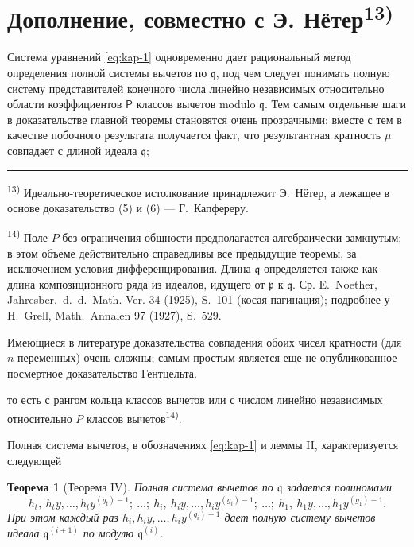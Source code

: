 \documentclass[11pt]{article}
\newcommand{\foreign}[1]{#1}
\theoremstyle{plain}
\newtheorem{satz}{Теорема}
\begin{document}
\newpage
\section*{Дополнение, совместно с Э. Нётер\textsuperscript{13)}}

Система уравнений \eqref{eq:kap-1} одновременно дает рациональный
метод определения полной системы вычетов по $\mathfrak{q}$, под чем
следует понимать полную систему представителей конечного числа
линейно независимых относительно области коэффициентов $\mathsf{P}$ классов
вычетов modulo $\mathfrak{q}$. Тем самым отдельные шаги в
доказательстве главной теоремы становятся очень прозрачными; вместе
с тем в качестве побочного результата получается факт, что
результантная кратность $\mu$ совпадает с длиной идеала
$\mathfrak{q}$;

\vspace{0.5em}
\noindent\rule{\textwidth}{0.4pt}
\vspace{0.3em}

{\footnotesize
\textsuperscript{13)} Идеально-теоретическое истолкование принадлежит
Э.\ Нётер, а лежащее в основе доказательство (5) и (6) --- Г.\ Капфереру.

\textsuperscript{14)} Поле $P$ без ограничения общности предполагается
алгебраически замкнутым; в этом объеме действительно справедливы все
предыдущие теоремы, за исключением условия дифференцирования. Длина
$\mathfrak{q}$ определяется также как длина композиционного ряда из
идеалов, идущего от $\mathfrak{p}$ к $\mathfrak{q}$. Ср. E.\ Noether,
\foreign{Jahresber.\ d.\ d.\ Math.-Ver.} 34 (1925), S.~101
(косая пагинация); подробнее у H.\ Grell, \foreign{Math.\ Annalen} 97
(1927), S.~529.

Имеющиеся в литературе доказательства совпадения обоих чисел
кратности (для $n$ переменных) очень сложны; самым простым является
еще не опубликованное посмертное доказательство Гентцельта.
}

\vspace{1em}
то есть с рангом кольца классов вычетов или с числом линейно
независимых относительно $P$ классов вычетов\textsuperscript{14)}.

Полная система вычетов, в обозначениях \eqref{eq:kap-1} и леммы II,
характеризуется следующей

\begin{satz}[Теорема IV]\label{satz:kap-IV}
Полная система вычетов по $\mathfrak{q}$ задается полиномами
\[
h_{t},\ h_{t}y,\ldots,h_{t}y^{(g_{t})-1};\ \ldots;\
h_{i},\ h_{i}y,\ldots,h_{i}y^{(g_{i})-1};\ \ldots;\
h_{1},\ h_{1}y,\ldots,h_{1}y^{(g_{1})-1}.
\]
При этом каждый раз $h_{i}, h_{i}y, \ldots, h_{i}y^{(g_{i})-1}$ дает
полную систему вычетов идеала $\mathfrak{q}^{(i+1)}$ по модулю
$\mathfrak{q}^{(i)}$.
\end{satz}
\end{document}
